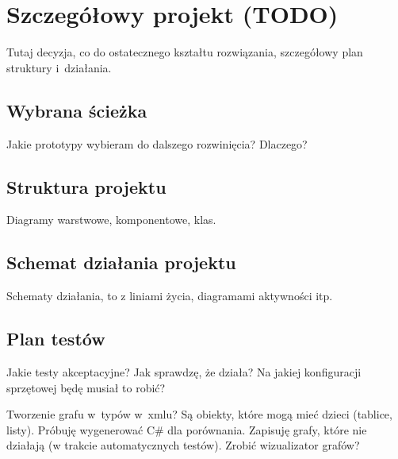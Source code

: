 \section{Szczegółowy projekt (TODO)}
Tutaj decyzja, co do ostatecznego kształtu rozwiązania, szczegółowy plan struktury i~działania.

\subsection{Wybrana ścieżka}
Jakie prototypy wybieram do dalszego rozwinięcia?
Dlaczego?




\subsection{Struktura projektu}
Diagramy warstwowe, komponentowe, klas.



\subsection{Schemat działania projektu}
Schematy działania, to z liniami życia, diagramami aktywności itp.


\subsection{Plan testów}
Jakie testy akceptacyjne? Jak sprawdzę, że działa? Na jakiej konfiguracji sprzętowej będę musiał to robić?

Tworzenie grafu w~typów w~xmlu? Są obiekty, które mogą mieć dzieci (tablice, listy). Próbuję wygenerować C\# dla porównania. Zapisuję grafy, które nie działają (w trakcie automatycznych testów). Zrobić wizualizator grafów?


